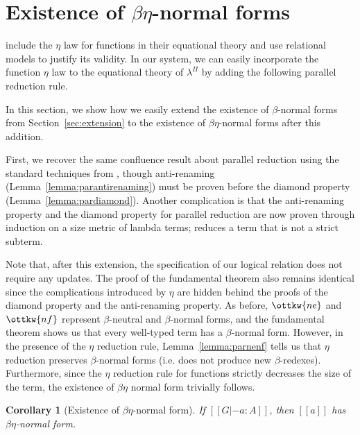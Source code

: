 \documentclass[\ifpublic nolinenum\else\fi,online,OA]{jfp}
\newcommand{\jc}[1]{}
\newcommand{\lang}{$\lambda^{\Pi}$\xspace}
\newtheorem{corollary}[theorem]{Corollary}
\theoremstyle{definition}
\begin{document}
\section{Existence of \texorpdfstring{$\beta\eta$-}{beta-eta--}normal forms}
\label{sec:betaeta}

\jc{Delete this section}

\citet{nbeincoq,decagda,martin-lof-a-la-coq}
include the $\eta$ law for functions in their equational theory and
use relational models to justify its validity.
In our system, we can easily incorporate the function $\eta$ law to the equational
theory of \lang{} by adding the following parallel reduction rule.
\begin{center}
\end{center}
In this section, we show how we easily extend the existence of $\beta$-normal
forms from Section~\ref{sec:extension} to the existence of
$\beta\eta$-normal forms after this addition. 

First, we recover the same confluence result about parallel reduction using the
standard techniques from \citet{barendregt:lambda-calculi-with-types,
  takahashi-parallel-reduction}, though anti-renaming
(Lemma~\ref{lemma:parantirenaming}) must be proven before the diamond property
(Lemma~\ref{lemma:pardiamond}). Another complication is that
the anti-renaming property and the diamond property for parallel reduction are now proven through
induction on a size metric of lambda terms;  reduces a term
that is not a strict subterm.

Note that, after this extension, the specification of our logical
relation does not require
any updates. The proof of the fundamental theorem also remains
identical since the complications introduced by $\eta$ are hidden
behind the proofs of the diamond property and the anti-renaming property.
As before, $\ottkw{ne}$ and $\ottkw{nf}$
represent $\beta$-neutral and $\beta$-normal forms, and the
fundamental theorem shows us that every well-typed term has a
$\beta$-normal form. However, in the presence of the $\eta$ reduction
rule, Lemma~\ref{lemma:parnenf} tells us that $\eta$ reduction
preserves $\beta$-normal forms (i.e. does not produce new
$\beta$-redexes). Furthermore, since the $\eta$ reduction rule for
functions strictly decreases the size of the term, the existence of
$\beta\eta$ normal form trivially follows.
\begin{corollary}[Existence of $\beta\eta$-normal form]
\label{corollary:exbetaeta}
If $[[G |- a : A]]$, then $[[a]]$ has $\beta\eta$-normal form.
\end{corollary}
\end{document}
